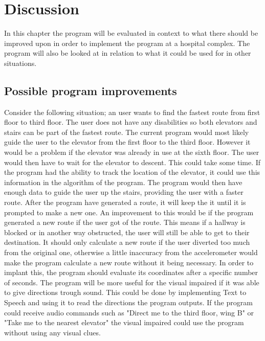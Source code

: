 \chapter{Discussion}

In this chapter the program will be evaluated in context to what there should be improved upon in order to implement the program at a hospital complex. The program will also be looked at in relation to what it could be used for in other situations.

\section{Possible program improvements}

Consider the following situation; an user wants to find the fastest route from first floor to third floor. The user does not have any disabilities so both elevators and stairs can be part of the fastest route. The current program would most likely guide the user to the elevator from the first floor to the third floor. However it would be a problem if the elevator was already in use at the sixth floor. The user would then have to wait for the elevator to descent. This could take some time. If the program had the ability to track the location of the elevator, it could use this information in the algorithm of the program. The program would then have enough data to guide the user up the stairs, providing the user with a faster route. 
\newline
After the program have generated a route, it will keep the it until it is prompted to make a new one. An improvement to this would be if the program generated a new route if the user got of the route. This means if a hallway is blocked or in another way obstructed, the user will still be able to get to their destination. It should only calculate a new route if the user diverted too much from the original one, otherwise a little inaccuracy from the accelerometer would make the program calculate a new route without it being necessary. In order to implant this, the program should evaluate its coordinates after a specific number of seconds.
The program will be more useful for the visual impaired if it was able to give directions trough sound. This could be done by implementing Text to Speech\cite{diss_tss} and using it to read the directions the program outputs. If the program could receive audio commands such as "Direct me to the third floor, wing B" or "Take me to the nearest elevator" the visual impaired could use the program without using any visual clues.

